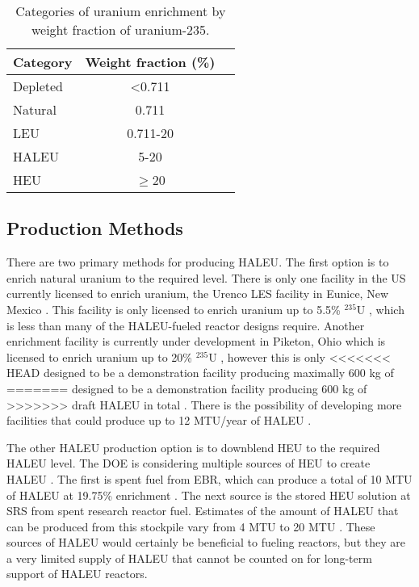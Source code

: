 \begin{table}[ht]
    \centering
    \caption{Categories of uranium enrichment by weight fraction of 
    uranium-235.}
    \label{tab:enrichemnt}
    \begin{tabular}{l c c}
        \hline
        Category & Weight fraction (\%)\\\hline
        Depleted & <0.711 \\
        Natural & 0.711 \\
        \gls{LEU} & 0.711-20 \\
        \gls{HALEU} & 5-20 \\
        \gls{HEU} & $\ge$20 \\
        \hline
    \end{tabular}
\end{table}

\subsection{Production Methods}
There are two primary methods for producing \gls{HALEU}. The first 
option is to enrich natural uranium to the required level. There is only one 
facility in the US currently 
licensed to enrich uranium, the Urenco LES facility in Eunice, 
New Mexico \cite{nuclear_energy_institute_establishing_2022}. This facility is only 
licensed to enrich uranium up to 5.5\% $^{235}$U 
\cite{nuclear_energy_institute_establishing_2022},
which is less than many of the \gls{HALEU}-fueled reactor designs 
require. Another enrichment facility is currently under development in 
Piketon, Ohio which is licensed to enrich uranium up to 20\% 
$^{235}$U \cite{nuclear_energy_institute_establishing_2022}, however this is only 
<<<<<<< HEAD
designed to be a demonstration facility producing maximally 600 kg of 
=======
designed to be a demonstration facility producing 600 kg of 
>>>>>>> draft
\gls{HALEU} in total \cite{us_nuclear_regulatory_commission_centrus_2021}.
There is the possibility of developing more facilities that could produce up 
to 12 MTU/year of \gls{HALEU} \cite{nuclear_energy_institute_establishing_2022}.

The other \gls{HALEU} production option is to downblend \gls{HEU} to 
the required \gls{HALEU}
level. The \gls{DOE} is considering multiple sources of \gls{HEU} 
to create \gls{HALEU} \cite{nuclear_energy_institute_establishing_2022}. The 
first is spent fuel from \gls{EBR}, which can produce a total of 10 MTU 
of \gls{HALEU} at 19.75\% enrichment \cite{nuclear_energy_institute_establishing_2022}. 
The next source is the stored \gls{HEU} solution at \gls{SRS} from 
spent research reactor fuel. Estimates of the amount of \gls{HALEU}
that can be produced from this stockpile vary from 4 MTU 
\cite{nuclear_energy_institute_establishing_2022} to 20 MTU \cite{regalbuto_addressing_2020}.
These sources of 
\gls{HALEU} would certainly be beneficial to fueling reactors, but they 
are a very limited supply of \gls{HALEU} that cannot be counted on 
for long-term support of \gls{HALEU} reactors.

